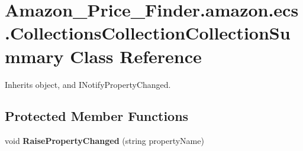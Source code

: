 \hypertarget{class_amazon___price___finder_1_1amazon_1_1ecs_1_1_collections_collection_collection_summary}{\section{Amazon\-\_\-\-Price\-\_\-\-Finder.\-amazon.\-ecs.\-Collections\-Collection\-Collection\-Summary Class Reference}
\label{class_amazon___price___finder_1_1amazon_1_1ecs_1_1_collections_collection_collection_summary}
}


 




Inherits object, and I\-Notify\-Property\-Changed.

\subsection*{Protected Member Functions}
\begin{DoxyCompactItemize}
\item 
\hypertarget{class_amazon___price___finder_1_1amazon_1_1ecs_1_1_collections_collection_collection_summary_a9a372a1bf2f6ac2e1befc68ecc7d7d09}{void {\bfseries Raise\-Property\-Changed} (string property\-Name)}\label{class_amazon___price___finder_1_1amazon_1_1ecs_1_1_collections_collection_collection_summary_a9a372a1bf2f6ac2e1befc68ecc7d7d09}

\end{DoxyCompactItemize}
